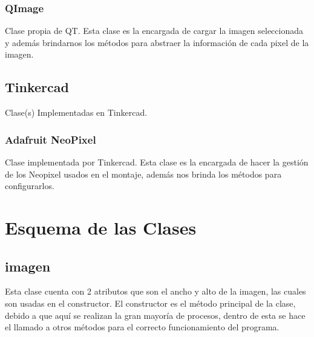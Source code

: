 \documentclass{article}
\begin{document}
    \begin{flushleft}
    \subsubsection{QImage}
    Clase propia de QT. Esta clase es la encargada de cargar la imagen seleccionada y además brindarnos los métodos para abstraer la información de cada pixel de la imagen.
    \end{flushleft}
    
    \begin{flushleft}
    \subsection{Tinkercad}
    Clase(s) Implementadas en Tinkercad.
    \end{flushleft}
    
     \begin{flushleft}
    \subsubsection{Adafruit NeoPixel}
    Clase implementada por Tinkercad. Esta clase es la encargada de hacer la gestión de los Neopixel usados en el montaje, además nos brinda los métodos para configurarlos.
    \end{flushleft}

    
\section{Esquema de las Clases}
\label{esquema}
    \begin{flushleft}
    \subsection{imagen}
    Esta clase cuenta con 2 atributos que son el ancho y alto de la imagen, las cuales son usadas en el constructor. El constructor es el método principal de la clase, debido a que aquí se realizan la gran mayoría de procesos, dentro de esta se hace el llamado a otros métodos para el correcto funcionamiento del programa.
    \end{flushleft}
    
\end{document}
